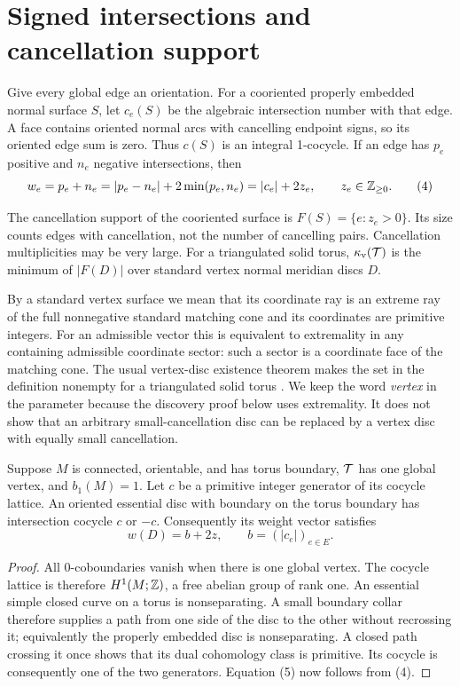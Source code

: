 \section{Signed intersections and cancellation support}
\label{sec:cancellation}

Give every global edge an orientation. For a cooriented properly embedded
normal surface $S$, let $c_e(S)$ be the algebraic intersection number with
that edge. A face contains oriented normal arcs with cancelling endpoint
signs, so its oriented edge sum is zero. Thus $c(S)$ is an integral
1-cocycle. If an edge has $p_e$ positive and $n_e$ negative intersections,
then
\[
       w_e=p_e+n_e=|p_e-n_e|+2\min(p_e,n_e)=|c_e|+2z_e,
       \qquad z_e\in\mathbb Z_{\ge0}.                             \tag{4}\label{eq:defect}
\]

\begin{definition}
The cancellation support of the cooriented surface is
$F(S)=\{e:z_e>0\}$. Its size counts edges with cancellation, not the
number of cancelling pairs. Cancellation multiplicities may be very large.
For a triangulated solid torus, $\kappa_{\mathrm{v}}(\mathcal T)$ is the minimum of
$|F(D)|$ over standard vertex normal meridian discs $D$.
\end{definition}

By a standard vertex surface we mean that its coordinate ray is an
extreme ray of the full nonnegative standard matching cone and its
coordinates are primitive integers. For an admissible vector this is
equivalent to extremality in any containing admissible coordinate sector:
such a sector is a coordinate face of the matching cone. The usual
vertex-disc existence theorem makes the set in the definition nonempty
for a triangulated solid torus \cite{hlp}. We keep the word \emph{vertex}
in the parameter because the discovery proof below uses extremality.
It does not show that an arbitrary small-cancellation disc can be replaced
by a vertex disc with equally small cancellation.

\begin{lemma}
\label{lem:cocycle}
Suppose $M$ is connected, orientable, and has torus boundary, $\mathcal T$ has
one global vertex, and $b_1(M)=1$. Let $c$ be a primitive
integer generator of its cocycle lattice. An oriented essential disc with
boundary on the torus boundary has intersection cocycle $c$ or $-c$.
Consequently its weight vector satisfies
\[
                w(D)=b+2z,\qquad b=(|c_e|)_{e\in E}.       \tag{5}\label{eq:base}
\]
\end{lemma}
\begin{proof}
All 0-coboundaries vanish when there is one global vertex. The cocycle
lattice is therefore $H^1(M;\mathbb Z)$, a free abelian group of rank one.
An essential simple closed curve on a torus is nonseparating. A small
boundary collar therefore supplies a path from one side of the disc to
the other without recrossing it; equivalently the properly embedded disc
is nonseparating. A closed path crossing it once shows that its dual
cohomology class is primitive. Its cocycle is consequently one of the two
generators. Equation (5) now follows from (4).
\end{proof}

